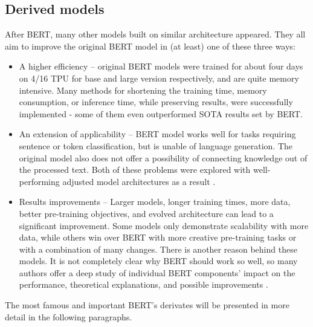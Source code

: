 \subsection{Derived models}
After BERT, many other models built on similar architecture appeared. They all aim to improve the original BERT model in (at least) one of these three ways:
\begin{itemize}
\item A higher efficiency -- original BERT models were trained for about four days on 4/16 TPU for base and large version respectively, and are quite memory intensive. Many methods for shortening the training time, memory consumption, or inference time, while preserving results, were successfully implemented - some of them even outperformed SOTA results set by BERT.
\item An extension of applicability -- BERT model works well for tasks requiring sentence or token classification, but is unable of language generation. The original model also does not offer a possibility of connecting knowledge out of the processed text. Both of these problems were explored with well-performing adjusted model architectures as a result \citep{Zhang2019}.
\item Results improvements -- Larger models, longer training times, more data,  better pre-training objectives, and evolved architecture can lead to a significant improvement. Some models only demonstrate scalability with more data, while others win over BERT with more creative pre-training tasks or with a combination of many changes. There is another reason behind these models. It is not completely clear why BERT should work so well, so many authors offer a deep study of individual BERT components' impact on the performance, theoretical explanations, and possible improvements \citep{Yang2019a,Liu2019}.
\end{itemize}
 The most famous and important BERT's derivates will be presented in more detail in the following paragraphs.
